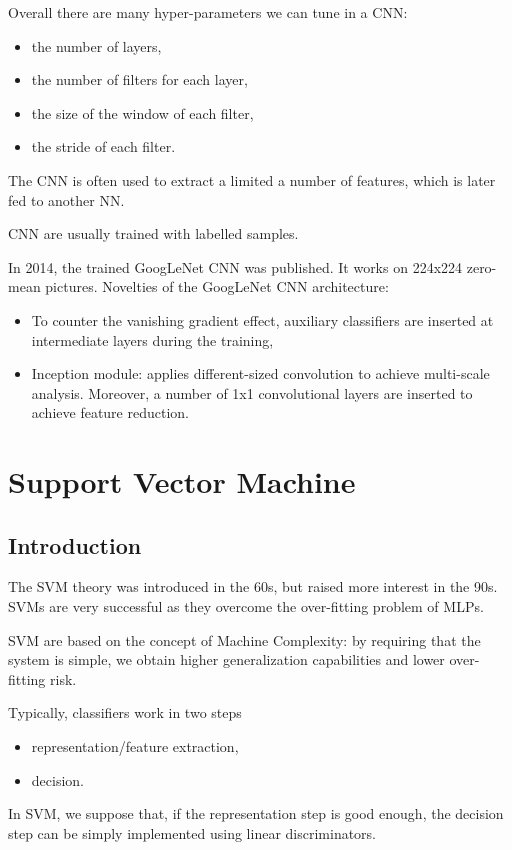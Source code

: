 \documentclass[oneside,onecolumn]{report}
\begin{document}
Overall there are many hyper-parameters we can tune in a CNN:
\begin{itemize}
    \item the number of layers,
    \item the number of filters for each layer,
    \item the size of the window of each filter,
    \item the stride of each filter.
\end{itemize}

The CNN is often used to extract a limited a number of features, which is later fed to another NN.

CNN are usually trained with labelled samples.

In 2014, the trained GoogLeNet CNN was published.
It works on 224x224 zero-mean pictures.
Novelties of the GoogLeNet CNN architecture:
\begin{itemize}
    \item To counter the vanishing gradient effect, auxiliary classifiers are inserted at intermediate layers during the training,
    \item Inception module: applies different-sized convolution to achieve multi-scale analysis. Moreover, a number of 1x1 convolutional layers are inserted to achieve feature reduction.
\end{itemize}



\chapter{Support Vector Machine}
\section{Introduction}
The SVM theory was introduced in the 60s, but raised more interest in the 90s.
SVMs are very successful as they overcome the over-fitting problem of MLPs.

SVM are based on the concept of Machine Complexity: by requiring that the system is simple, we obtain higher generalization capabilities and lower over-fitting risk.

Typically, classifiers work in two steps
\begin{itemize}
    \item representation/feature extraction,
    \item decision.
\end{itemize}
In SVM, we suppose that, if the representation step is good enough, the decision step can be simply implemented using linear discriminators.
\end{document}
